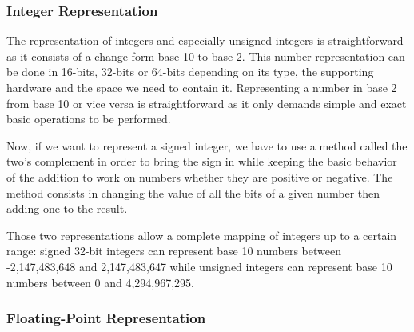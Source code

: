 \subsubsection{Integer Representation}

The representation of integers and especially unsigned integers is straightforward as it consists of a change form base 10 to base 2. This number representation can be done in 16-bits, 32-bits or 64-bits depending on its type, the supporting hardware and the space we need to contain it. Representing a number in base 2 from base 10 or vice versa is straightforward as it only demands simple and exact basic operations to be performed.


Now, if we want to represent a signed integer, we have to use a method called the two's complement in order to bring the sign in while keeping the basic behavior of the addition to work on numbers whether they are positive or negative. The method consists in changing the value of all the bits of a given number then adding one to the result.


Those two representations allow a complete mapping of integers up to a certain range: signed 32-bit integers can represent base 10 numbers between -2,147,483,648 and 2,147,483,647 while unsigned integers can represent base 10 numbers between 0 and 4,294,967,295.

\subsubsection{Floating-Point Representation}


